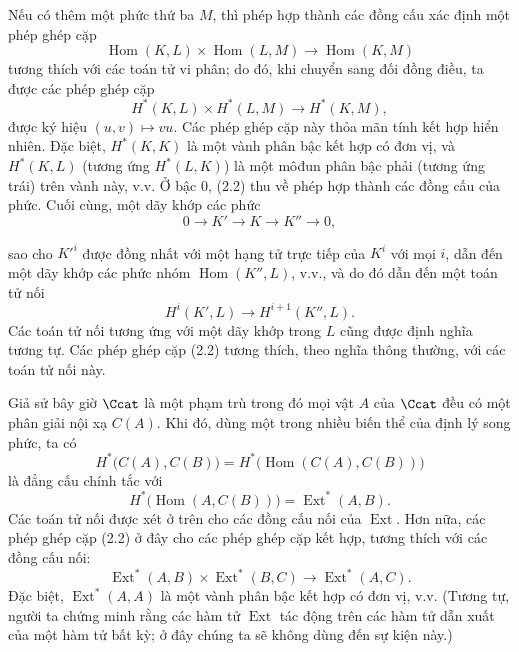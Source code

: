 Nếu có thêm một phức thứ ba $M$, thì phép hợp thành các đồng cấu
xác định một phép ghép cặp
\[
  \operatorname{Hom}(K,L)\times\operatorname{Hom}(L,M)
  \longrightarrow\operatorname{Hom}(K,M)
\]
tương thích với các toán tử vi phân; do đó, khi chuyển sang đối đồng điều,
ta được các phép ghép cặp
\begin{equation}\tag{2.2}
  H^{*}(K,L)\times H^{*}(L,M)\longrightarrow H^{*}(K,M),
\end{equation}
được ký hiệu $(u,v)\longmapsto vu$. Các phép ghép cặp này thỏa mãn tính
kết hợp hiển nhiên. Đặc biệt, $H^{*}(K,K)$ là một vành phân bậc kết hợp
có đơn vị, và $H^{*}(K,L)$ (tương ứng $H^{*}(L,K)$) là một môđun phân bậc phải
(tương ứng trái) trên vành này, v.v. Ở bậc $0$, (2.2) thu về
phép hợp thành các đồng cấu của phức. Cuối cùng, một dãy khớp các
phức
\[
  0\longrightarrow K'\longrightarrow K\longrightarrow K''\longrightarrow 0,
\]

sao cho $K'^{i}$ được đồng nhất với một hạng tử trực tiếp của $K^{i}$ với mọi $i$,
dẫn đến một dãy khớp các phức nhóm $\operatorname{Hom}(K'',L)$, v.v., và do đó dẫn đến một
toán tử nối
\[
  H^{i}(K',L)\longrightarrow H^{i+1}(K'',L).
\]
Các toán tử nối tương ứng với một dãy khớp trong $L$ cũng được định nghĩa tương tự. Các
phép ghép cặp (2.2) tương thích, theo nghĩa thông thường, với các toán tử nối này.

Giả sử bây giờ $\Ccat$ là một phạm trù trong đó mọi vật $A$ của $\Ccat$
đều có một phân giải nội xạ $C(A)$. Khi đó, dùng một trong nhiều biến thể của định lý song phức, ta có
\[
  H^{*}\bigl(C(A),C(B)\bigr)
  =H^{*}\bigl(\operatorname{Hom}(C(A),C(B))\bigr)
\]
là đẳng cấu chính tắc với
\[
  H^{*}\bigl(\operatorname{Hom}(A,C(B))\bigr)
  =\operatorname{Ext}^{*}(A,B).
\]
Các toán tử nối được xét ở trên cho các đồng cấu nối của
$\operatorname{Ext}$. Hơn nữa, các phép ghép cặp (2.2) ở đây cho
các phép ghép cặp kết hợp, tương thích với các đồng cấu nối:
\begin{equation}\tag{2.3}
  \operatorname{Ext}^{*}(A,B)\times\operatorname{Ext}^{*}(B,C)
  \longrightarrow\operatorname{Ext}^{*}(A,C).
\end{equation}
Đặc biệt, $\operatorname{Ext}^{*}(A,A)$ là một vành phân bậc kết hợp
có đơn vị, v.v. (Tương tự, người ta chứng minh rằng các hàm tử
$\operatorname{Ext}$ tác động trên các hàm tử dẫn xuất của một hàm tử
bất kỳ; ở đây chúng ta sẽ không dùng đến sự kiện này.)

